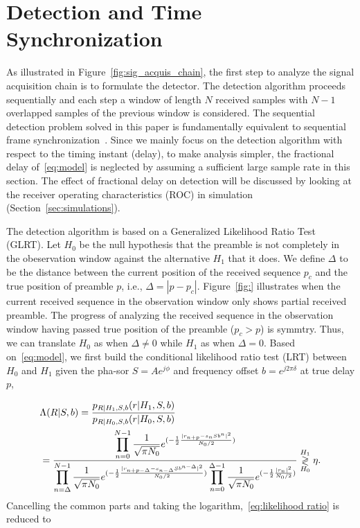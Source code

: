 \section{Detection and Time Synchronization}
\label{sec:detection}

As illustrated in Figure~\ref{fig:sig_acquis_chain}, the first step to analyze
the signal acquisition chain is to formulate the detector.
The detection algorithm proceeds sequentially and each step a window of length $N$ received samples with 
$N-1$ overlapped samples of the previous window is considered. The sequential detection problem solved 
in this paper is fundamentally equivalent to sequential frame synchronization~\cite{Massey_72,Lui_Tan_86,Scholtz_80}.
Since we mainly focus on the detection algorithm with respect to the timing instant (delay), to make analysis simpler,
the fractional delay of~\eqref{eq:model} is neglected by assuming a sufficient large sample rate in this section. 
The effect of fractional delay on detection will be discussed by looking at the receiver operating characteristics (ROC) in simulation (Section~\ref{sec:simulations}).

The detection algorithm is based on a Generalized Likelihood Ratio Test (GLRT).
Let $H_0$ be the null hypothesis that the preamble is not completely in the obeservation window against the alternative 
$H_1$ that it does. We define $\Delta$ to be the distance between the current position of the received sequence $p_c$ and the true position of preamble $p$, 
i.e., $\Delta=|p-p_c|$. Figure~\ref{fig:} illustrates when the current received sequence in the observation window only shows partial received preamble.
The progress of analyzing the received sequence in the observation window having passed
true position of the preamble ($p_c>p$) is symmtry. Thus, we can translate $H_0$ as when $\Delta \neq 0$ while $H_1$ as when $\Delta=0$.
Based on~\eqref{eq:model}, we first build the conditional likelihood ratio test (LRT) between $H_0$ and $H_1$ given the pha-sor $S{=}Ae^{j\phi}$ and frequency offset $b{=}e^{j2\pi \delta}$
at true delay $p$,

\begin{equation}
    \label{eq:likelihood ratio}
    \begin{aligned}
    &\Lambda(R|S,b)=\frac{p_{R|H_1,S,b}(r|H_1,S,b)}{p_{R|H_0,S,b}(r|H_0,S,b)} \\
    &=\frac{\displaystyle \prod_{n=0}^{N-1}\frac{1}{\sqrt{\pi N_0}}e^{(-\frac{1}{2}\frac{|r_{n+p}{-}s_nSb^n|^2}{N_0/2})}}
    {\displaystyle \prod_{n=\Delta}^{N-1}\frac{1}{\sqrt{\pi N_0}}e^{(-\frac{1}{2}\frac{|r_{n+p-\Delta}{-}s_{n-\Delta}Sb^{n-\Delta}|^2}{N_0/2})} 
    \displaystyle \prod_{n=0}^{\Delta-1}\frac{1}{\sqrt{\pi N_0}}e^{(-\frac{1}{2}\frac{|r_n|^2}{N_0/2})}} \mathrel{\mathop\gtrless\limits^{H_1}_{H_0}} \eta.
    \end{aligned}
\end{equation}
Cancelling the common parts and taking the logarithm,~\eqref{eq:likelihood ratio} is reduced to

